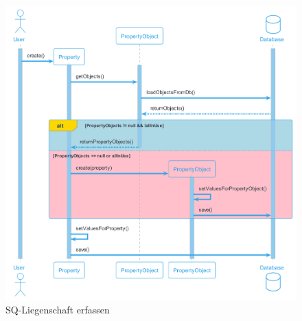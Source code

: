 \begin{figure}[H]
  \begin{center}
    \includegraphics[width=1\linewidth]{content/diagrams/out/sequenzdiagram/liegenschaftErfassen/LiegenschaftErfassen.png}
    \caption{SQ-Liegenschaft erfassen}
    \label{sqliegenschaft}
  \end{center}
\end{figure}

